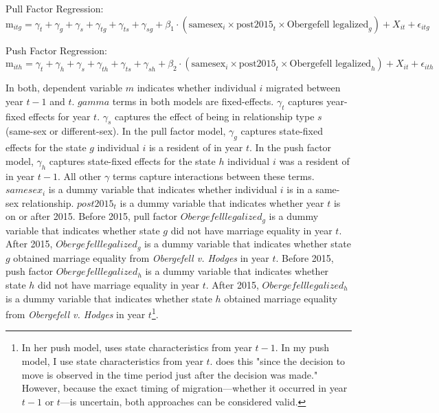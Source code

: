 \documentclass[12pt,letterpaper]{article}
\begin{document}
\hfill
\break
Pull Factor Regression:
\begin{equation}
\text{m}_{itg} = \gamma_t + \gamma_g + \gamma_s + \gamma_{tg} + \gamma_{ts} + \gamma_{sg} + \beta_1 \cdot (\text{samesex}_i \times \text{post2015}_t \times \text{Obergefell legalized}_g) 
+ X_{it} + \epsilon_{itg}
\end{equation}

\hfill
\break
Push Factor Regression:
\begin{equation}
\text{m}_{ith} = \gamma_t + \gamma_h + \gamma_s + \gamma_{th} + \gamma_{ts} + \gamma_{sh} + \beta_2 \cdot (\text{samesex}_i \times \text{post2015}_t \times \text{Obergefell legalized}_h) 
+ X_{it} + \epsilon_{ith}
\end{equation}

In both, dependent variable $m$ indicates whether individual $i$ migrated between year $t-1$ and $t$. $gamma$ terms in both models are fixed-effects. $\gamma_t$ captures year-fixed effects for year $t$. $\gamma_s$ captures the effect of being in relationship type $s$ (same-sex or different-sex). In the pull factor model, $\gamma_g$ captures state-fixed effects for the state $g$ individual $i$ is a resident of in year $t$. In the push factor model, $\gamma_h$ captures state-fixed effects for the state $h$ individual $i$ was a resident of in year $t-1$. All other $\gamma$ terms capture interactions between these terms. $samesex_i$ is a dummy variable that indicates whether individual $i$ is in a same-sex relationship. $post2015_t$ is a dummy variable that indicates whether year $t$ is on or after 2015. Before 2015, pull factor $Obergefell legalized_g$ is a dummy variable that indicates whether state $g$ did not have marriage equality in year $t$. After 2015, $Obergefell legalized_g$ is a dummy variable that indicates whether state $g$ obtained marriage equality from \textit{Obergefell v. Hodges} in year $t$. Before 2015, push factor $Obergefell legalized_h$ is a dummy variable that indicates whether state $h$ did not have marriage equality in year $t$. After 2015, $Obergefell legalized_h$ is a dummy variable that indicates whether state $h$ obtained marriage equality from \textit{Obergefell v. Hodges} in year $t$\footnote{In her push model, \citet{12} uses state characteristics from year $t-1$. In my push model, I use state characteristics from year $t$. \citet{12} does this "since the decision to move is observed in the time
period just after the decision was made." However, because the exact timing of migration—whether it occurred in year $t-1$ or $t$—is uncertain, both approaches can be considered valid.}.
\end{document}
